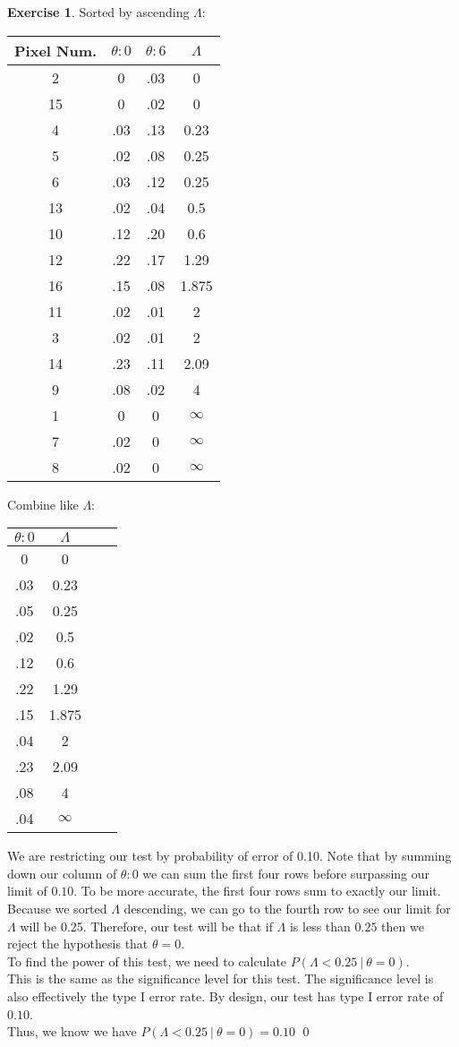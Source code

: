 \documentclass[11pt]{article}
\theoremstyle{definition}
\newtheorem{exercise}[theorem]{Exercise}
\newcommand{\st}{\ |\ }
\newcommand{\V}{\vspace{0.3cm}\\}
\begin{document}
\begin{exercise}
Sorted by ascending $\Lambda$:
\begin{center}
\begin{tabular}{ |c|c|c|c|} 
 \hline
 Pixel Num. & $\theta: 0$ & $\theta: 6$ & $\Lambda$ \\
 \hline
 2 & 0 & .03 & 0 \\ 
 15 & 0 & .02 & 0 \\ 
 4 & .03 & .13 & 0.23 \\ 
 5 & .02 & .08 & 0.25 \\ 
 6 & .03 & .12 & 0.25 \\
 13 & .02 & .04 & 0.5 \\
 10 & .12 & .20 & 0.6 \\
 12 & .22 & .17 & 1.29 \\
 16 & .15 & .08 & 1.875 \\  
 11 & .02 & .01 & 2 \\ 
 3 & .02 & .01 & 2 \\
 14 & .23 & .11 & 2.09 \\
 9 & .08 & .02 & 4 \\ 
 1 & 0 & 0 &  $\infty$ \\ 
 7 & .02 & 0 & $\infty$ \\ 
 8 & .02 & 0 & $\infty$ \\  
 \hline
\end{tabular}
\end{center}

Combine like $\Lambda$:
\begin{center}
\begin{tabular}{ |c|c|c|c|} 
 \hline
 $\theta: 0$ &  $\Lambda$ \\
 \hline
 0 &  0 \\ 
 .03 & 0.23 \\ 
 .05 & 0.25 \\ 
 .02 & 0.5 \\
 .12 & 0.6 \\
 .22 & 1.29 \\
 .15 & 1.875 \\  
 .04 & 2 \\ 
 .23 & 2.09 \\
 .08 & 4 \\  
 .04 & $\infty$ \\  
 \hline
\end{tabular}
\end{center}

We are restricting our test by probability of error of 0.10. Note that by summing down our column of $\theta :0$ we can sum the first four rows before surpassing our limit of $0.10$. To be more accurate, the first four rows sum to exactly our limit. \V
Because we sorted $\Lambda$ descending, we can go to the fourth row to see our limit for $\Lambda$ will be 0.25. Therefore, our test will be that if $\Lambda$ is less than $0.25$ then we reject the hypothesis that $\theta = 0$. \V
To find the power of this test, we need to calculate $P( \Lambda < 0.25 \st \theta = 0)$. \V
This is the same as the significance level for this test. The significance level is also effectively the type I error rate. By design, our test has type I error rate of $0.10$. \V
Thus, we know we have $P( \Lambda < 0.25 \st \theta = 0) = 0.10$ \qed
\end{exercise}
\end{document}
